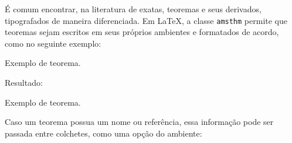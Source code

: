 \documentclass[xindy,rascunho]{fei}
\begin{document}
    É comum encontrar, na literatura de exatas, teoremas e seus derivados, tipografados de maneira diferenciada. Em \LaTeX, a classe \texttt{amsthm} permite que teoremas sejam escritos em seus próprios ambientes e formatados de acordo, como no seguinte exemplo:
    
\begin{latexcode}
\begin{teorema}
Exemplo de teorema.
\end{teorema}
\end{latexcode}

Resultado:

\begin{teorema}\label{thm:ex1}
Exemplo de teorema.
\end{teorema}

Caso um teorema possua um nome ou referência, essa informação pode ser passada entre colchetes, como uma opção do ambiente:
\end{document}

